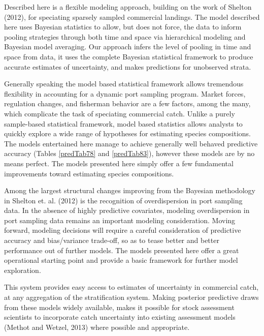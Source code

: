 \documentclass[12pt]{article}
\begin{document}
Described here is a flexible modeling approach, building on the work of Shelton 
(2012), for speciating sparsely sampled commercial landings. The model 
described here uses Bayesian statistics to allow, but does not force, the data 
to inform pooling strategies through both time and space via hierarchical 
modeling and Bayesian model averaging. Our approach infers the level of pooling 
in time and space from data, it uses the complete Bayesian statistical 
framework to produce accurate estimates of uncertainty, and makes predictions 
for unobserved strata. 

Generally speaking the model based statistical framework allows tremendous 
flexibility in accounting for a dynamic port sampling program. Market 
forces, regulation changes, and fisherman behavior are a few factors, among 
the many, which complicate the task of speciating commercial catch. 
Unlike a purely sample-based statistical framework, model based statistics 
allows analysts to quickly explore a wide range of hypotheses for 
estimating species compositions. The models entertained here manage to 
achieve generally well behaved predictive accuracy (Tables \ref{predTab78} 
and \ref{predTab83}), however these models are by no means perfect. The 
models presented here simply offer a few fundamental improvements toward 
estimating species compositions.

Among the largest structural changes improving from the Bayesian
methodology in Shelton et. al. (2012) is the recognition of
overdispersion in port sampling data. In the absence of highly
predictive covariates, modeling overdispersion in port sampling data
remains an important modeling consideration. Moving forward, modeling
decisions will require a careful consideration of predictive accuracy
and bias/variance trade-off, so as to tease better and better
performance out of further models. The models presented here offer a
great operational starting point and provide a basic framework for
further model exploration.

This system provides easy access to estimates of uncertainty in commercial 
catch, at any aggregation of the stratification system. Making posterior 
predictive draws from these models widely available, makes it possible for 
stock assessment scientists to incorporate catch uncertainty into existing 
assessment models (Methot and Wetzel, 2013) where possible and appropriate. 

%
\end{document}
